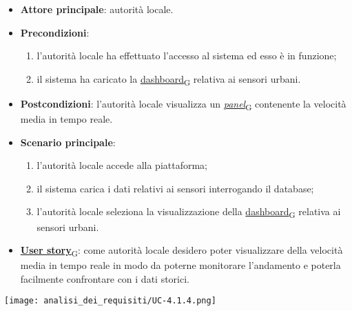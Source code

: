 \begin{itemize}
	\item \textbf{Attore principale}: autorità locale.
	\item \textbf{Precondizioni}:
	      \begin{enumerate}
		      \item l'autorità locale ha effettuato l'accesso al sistema ed esso è in funzione;
		      \item il sistema ha caricato la \href{https://7last.github.io/docs/pb/documentazione-interna/glossario\#dashboard}{dashboard\textsubscript{G}} relativa ai sensori urbani.
	      \end{enumerate}
	\item \textbf{Postcondizioni}: l'autorità locale visualizza un \href{https://7last.github.io/docs/pb/documentazione-interna/glossario\#panel}{\textit{panel}\textsubscript{G}} contenente la velocità media in tempo reale.
	\item \textbf{Scenario principale}:
	      \begin{enumerate}
		      \item l'autorità locale accede alla piattaforma;
		      \item il sistema carica i dati relativi ai sensori interrogando il database;
		      \item l'autorità locale seleziona la visualizzazione della \href{https://7last.github.io/docs/pb/documentazione-interna/glossario\#dashboard}{dashboard\textsubscript{G}} relativa ai sensori urbani.
	      \end{enumerate}
	\item \href{https://7last.github.io/docs/pb/documentazione-interna/glossario\#user-story}{\textbf{User story}\textsubscript{G}}:
	      come autorità locale desidero poter visualizzare della velocità media in tempo reale in modo da poterne monitorare l'andamento
	      e poterla facilmente confrontare con i dati storici.
\end{itemize}
\begin{center}
	\texttt{[image: analisi\_dei\_requisiti/UC-4.1.4.png]}
\end{center}

